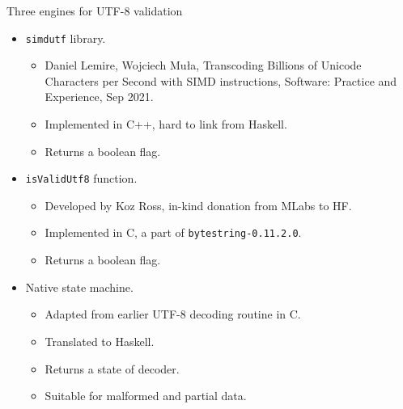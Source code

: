 \documentclass[handout]{beamer}
\begin{document}
\begin{frame}{Three engines for UTF-8 validation}

\begin{itemize}

\item {\tt simdutf} library.
  \begin{itemize}
  \item
    Daniel Lemire, Wojciech Mu\l{}a, Transcoding Billions
    of Unicode Characters per Second with SIMD instructions,
    Software: Practice and Experience, Sep 2021.
  \item
    Implemented in C++, hard to link from Haskell.
  \item
    Returns a boolean flag.
  \end{itemize}
  \pause

\item {\tt isValidUtf8} function.
  \begin{itemize}
  \item Developed by Koz Ross, in-kind donation from MLabs to HF.
  \item Implemented in C, a part of {\tt bytestring-0.11.2.0}.
  \item Returns a boolean flag.
  \end{itemize}
  \pause

\item Native state machine.
  \begin{itemize}
  \item Adapted from earlier UTF-8 decoding routine in C.
  \item Translated to Haskell.
  \item Returns a state of decoder.
  \item Suitable for malformed and partial data.
  \end{itemize}

\end{itemize}

\end{frame}
\end{document}

